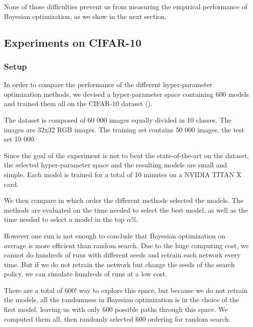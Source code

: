None of those difficulties prevent us from measuring the empirical performance of Bayesian optimization, as we show in the next section.

\subsection{Experiments on CIFAR-10}
\label{ssec:cifar_analysis}

\subsubsection{Setup}

In order to compare the performance of the different hyper-parameter optimization methods, we devised a hyper-parameter space containing 600 models and trained them all on the CIFAR-10 dataset (\textcite{krizhevsky2009}).

The dataset is composed of 60 000 images equally divided in 10 classes. The images are 32x32 RGB images. The training set contains 50 000 images, the test set 10 000.

Since the goal of the experiment is not to beat the state-of-the-art on the dataset, the selected hyper-parameter space and the resulting models are small and simple. Each model is trained for a total of 10 minutes on a NVIDIA TITAN X card. 

We then compare in which order the different methods selected the models. The methods are evaluated on the time needed to select the best model, as well as the time needed to select a model in the top $\alpha \%$.

However one run is not enough to conclude that Bayesian optimization on average is more efficient than random search. Due to the huge computing cost, we cannot do hundreds of runs with different seeds and retrain each network every time. But if we do not retrain the network but change the seeds of the search policy, we can simulate hundreds of runs at a low cost. 

There are a total of $600!$ way to explore this space, but because we do not retrain the models, all the randomness in Bayesian optimization is in the choice of the first model, leaving us with only 600 possible paths through this space. We computed them all, then randomly selected 600 ordering for random search.

